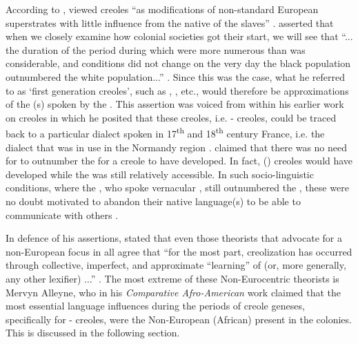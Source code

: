 According to  \citet{Braun09},  \citet{Chaudenson92} viewed creoles ``as modifications of non-standard European superstrates with little influence from the native  of the slaves'' \citep[3]{Braun09}. \citet{Chaudenson92} asserted that when we closely examine how colonial societies got their start, we will see that ``... the duration of the period during which  were more numerous than  was considerable, and conditions did not change on the very day the black population outnumbered the white population...'' \citep[60]{Chaudenson92}. Since this was the case, what he referred to as `first generation creoles', such as , , etc., would therefore be approximations of the (s) spoken by the . This assertion was voiced from within his earlier work on  creoles in which he posited that these creoles, i.e. - creoles, could be traced back to a particular  dialect spoken in 17\textsuperscript{th} and 18\textsuperscript{th} century France, i.e. the dialect that was in use in the Normandy region \citep{Chaudenson79}.  \citet{Chaudenson79} claimed that there was no need for  to outnumber the  for a creole to have developed. In fact, () creoles would have developed while the  was still relatively accessible. In such socio-linguistic conditions, where the , who spoke vernacular , still outnumbered the , these  were no doubt motivated to abandon their native language(s) to be able to communicate with others \citep{Chaudenson79}.

In defence of his assertions,  \citet{Chaudenson01} stated that even those theorists that advocate for a non-European focus in  all agree that ``for the most part, creolization has occurred through collective, imperfect, and approximate ``learning'' of  (or, more generally, any other lexifier) ...'' \citep{Chaudenson01}. The most extreme of these Non-Eurocentric theorists is Mervyn Alleyne, who in his \emph{Comparative Afro-American} work \citep{Alleyne80} claimed that the most essential language influences during the periods of creole geneses, specifically for - creoles, were the Non-European (African)  present in the colonies. This is discussed in the following section.

